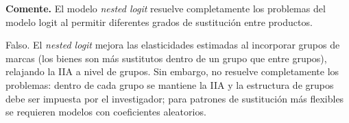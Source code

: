 \question \textbf{Comente.} El modelo \emph{nested logit} resuelve completamente los problemas del modelo logit al permitir diferentes grados de sustitución entre productos.
\begin{solution}
Falso. El \emph{nested logit} mejora las elasticidades estimadas al incorporar grupos de marcas (los bienes son más sustitutos dentro de un grupo que entre grupos), relajando la IIA a nivel de grupos. Sin embargo, no resuelve completamente los problemas: dentro de cada grupo se mantiene la IIA y la estructura de grupos debe ser impuesta por el investigador; para patrones de sustitución más flexibles se requieren modelos con coeficientes aleatorios.

\end{solution}

